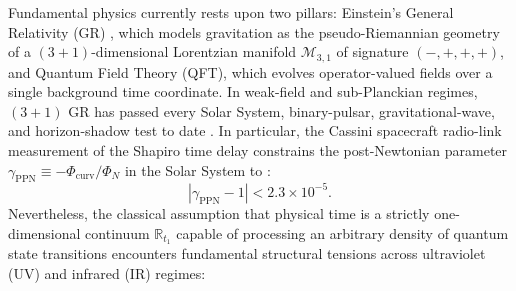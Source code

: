 \documentclass[11pt,a4paper]{article}
\theoremstyle{definition}
\theoremstyle{remark}
\begin{document}
Fundamental physics currently rests upon two pillars: Einstein's General Relativity (GR) \cite{Einstein1915,Schwarzschild1916,ADM1962}, which models gravitation as the pseudo-Riemannian geometry of a $(3+1)$-dimensional Lorentzian manifold $\mathcal{M}_{3,1}$ of signature $(-,+,+,+)$, and Quantum Field Theory (QFT), which evolves operator-valued fields over a single background time coordinate. In weak-field and sub-Planckian regimes, $(3+1)$ GR has passed every Solar System, binary-pulsar, gravitational-wave, and horizon-shadow test to date \cite{Bertotti2003,Will2014,Abbott2016,Abbott2017_GW170817,EHT2019,EHT2022}. In particular, the Cassini spacecraft radio-link measurement of the Shapiro time delay constrains the post-Newtonian parameter $\gamma_{\text{PPN}} \equiv -\Phi_{\text{curv}}/\Phi_N$ in the Solar System to \cite{Bertotti2003,Will2014}:
\begin{equation}
  \left|\gamma_{\text{PPN}} - 1\right| < 2.3 \times 10^{-5}.
  \label{eq:cassini_bound_intro}
\end{equation}
Nevertheless, the classical assumption that physical time is a strictly one-dimensional continuum $\mathbb{R}_{t_1}$ capable of processing an arbitrary density of quantum state transitions encounters fundamental structural tensions across ultraviolet (UV) and infrared (IR) regimes:
\end{document}
